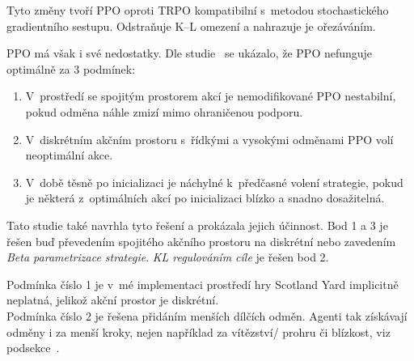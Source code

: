Tyto změny tvoří PPO oproti TRPO kompatibilní s~metodou stochastického gradientního sestupu.
Odstraňuje K--L omezení a nahrazuje je ořezáváním.

PPO má však i své nedostatky.
\label{PPO_weakness}
Dle studie~\cite{PPO_weakness} se ukázalo, že PPO nefunguje optimálně za 3 podmínek:
\begin{enumerate}
  \item V~prostředí se spojitým prostorem akcí je nemodifikované PPO nestabilní, pokud odměna náhle zmizí mimo ohraničenou podporu.
  \item V~diskrétním akčním prostoru s~řídkými a vysokými odměnami PPO volí neoptimální akce.
  \item V~době těsně po inicializaci je náchylné k~předčasné volení strategie, pokud je některá z~optimálních akcí po inicializaci blízko a snadno dosažitelná.
\end{enumerate}

Tato studie také navrhla tyto řešení a prokázala jejich účinnost.
Bod 1 a 3 je řešen buď převedením spojitého akčního prostoru na diskrétní nebo zavedením \emph{Beta parametrizace strategie}.
\emph{KL regulováním cíle} je řešen bod 2.

Podmínka číslo 1 je v~mé implementaci prostředí hry Scotland Yard implicitně neplatná, jelikož akční prostor je diskrétní.\\
Podmínka číslo 2 je řešena přidáním menších dílčích odměn.
Agenti tak získávají odměny i za menší kroky, nejen například za vítězství/ prohru či blízkost, viz podsekce~.\\

